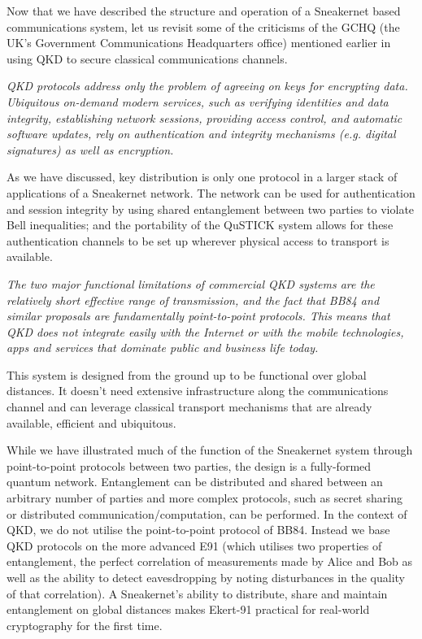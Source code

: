 \documentclass[twocolumn, aps, rmp, amsmath, amssymb, nofootinbib, superscriptaddress, longbibliography, floatfix, table-of-contents, eqsecnum]{revtex4-2}
\begin{document}
Now that we have described the structure and operation of a Sneakernet based communications system, let us revisit some of the criticisms of the GCHQ (the UK's Government Communications Headquarters office) mentioned earlier in using QKD to secure classical communications channels. 

\textit{QKD protocols address only the problem of agreeing on keys for encrypting data. Ubiquitous on-demand modern services, such as verifying identities and data integrity, establishing network sessions, providing access control, and automatic software updates, rely on authentication and integrity mechanisms (e.g. digital signatures) as well as encryption.}

As we have discussed, key distribution is only one protocol in a larger stack of applications of a Sneakernet network. The network can be used for authentication and session integrity by using shared entanglement between two parties to violate Bell inequalities; and the portability of the QuSTICK system allows for these authentication channels to be set up wherever physical access to transport is available.

\textit{The two major functional limitations of commercial QKD systems are the relatively short effective range of transmission, and the fact that BB84 and similar proposals are fundamentally point-to-point protocols. This means that QKD does not integrate easily with the Internet or with the mobile technologies, apps and services that dominate public and business life today.}

This system is designed from the ground up to be functional over global distances. It doesn't need extensive infrastructure along the communications channel and can leverage classical transport mechanisms that are already available, efficient and ubiquitous. 

While we have illustrated much of the function of the Sneakernet system through point-to-point protocols between two parties, the design is a fully-formed quantum network. Entanglement can be distributed and shared between an arbitrary number of parties and more complex protocols, such as secret sharing or distributed communication/computation, can be performed. In the context of QKD, we do not utilise the point-to-point protocol of BB84. Instead we base QKD protocols on the more advanced E91 (which utilises two properties of entanglement, the perfect correlation of measurements made by Alice and Bob as well as the ability to detect eavesdropping by noting disturbances in the quality of that correlation). A Sneakernet's ability to distribute, share and maintain entanglement on global distances makes Ekert-91 practical for real-world cryptography for the first time.
\end{document}
